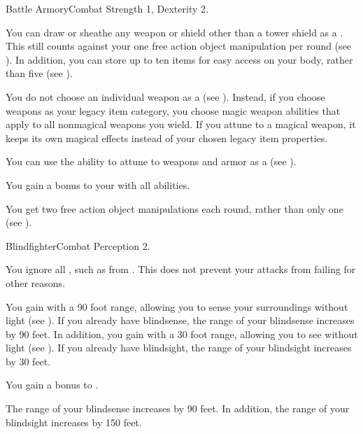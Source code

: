   \begin{feat}{Battle Armory}{Combat}
    \featpre Strength 1, Dexterity 2.

     You can draw or sheathe any weapon or shield other than a tower shield as a .
    This still counts against your one free action object manipulation per round (see ).
    In addition, you can store up to ten items for easy access on your body, rather than five (see ).

     You do not choose an individual weapon as a  (see ).
    Instead, if you choose weapons as your legacy item category, you choose magic weapon abilities that apply to all nonmagical weapons you wield.
    If you attune to a magical weapon, it keeps its own magical effects instead of your chosen legacy item properties.

     You can use the  ability to attune to weapons and armor as a  (see ).

     You gain a  bonus to your  with all abilities.

     You get two free action object manipulations each round, rather than only one (see ).
  \end{feat}

  \begin{feat}{Blindfighter}{Combat}
    \featpre Perception 2.

     You ignore all , such as from .
    This does not prevent your attacks from failing for other reasons.

     You gain  with a 90 foot range, allowing you to sense your surroundings without light (see ).
    If you already have blindsense, the range of your blindsense increases by 90 feet.
    In addition, you gain  with a 30 foot range, allowing you to see without light (see ).
    If you already have blindsight, the range of your blindsight increases by 30 feet.

     You gain a  bonus to .

     The range of your blindsense increases by 90 feet.
    In addition, the range of your blindsight increases by 150 feet.
  \end{feat}

